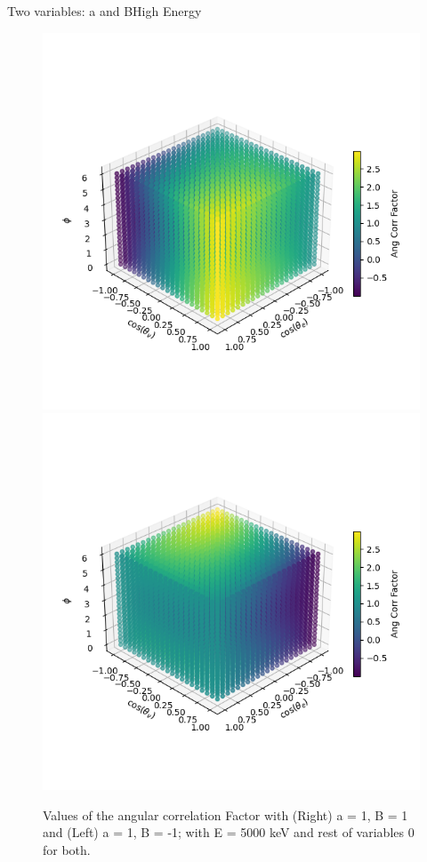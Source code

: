\documentclass{beamer}
\begin{document}
\begin{frame}{Two variables: a and B}{High Energy}
	\begin{figure}
		\centering
		\includegraphics[width=0.4\paperwidth]{plots/posa_posB_hiE_3D}
		\includegraphics[width=0.4\paperwidth]{plots/posa_negB_hiE_3D}
		\caption{Values of the angular correlation Factor with (Right) a = 1, B = 1 and (Left) a = 1, B = -1; with E = 5000 keV and rest of variables 0 for both.}
	\end{figure}
\end{frame}
\end{document}

